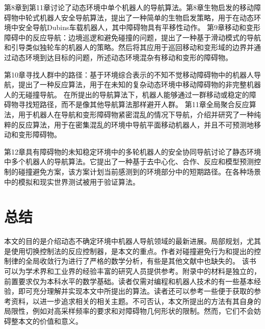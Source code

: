 第8章到第11章讨论了动态环境中单个机器人的导航算法。第8章生物启发的移动障碍物中轮式机器人安全导航算法，提出了一种简单的生物启发策略，用于在动态环境中安全导航Dubins车载机器人，其中障碍物具有平移性动作。
第9章移动和变形障碍中的反应导航：边境巡逻和避免碰撞的问题，提出了一种基于滑动模式的导航和引导类似独轮车的机器人的策略。然后将其应用于巡回移动和变形域的边界并通过动态环境到达目标的问题，所述动态环境混杂有移动和变形的障碍物。

第10章寻找人群中的路径：基于环境综合表示的不知不觉移动障碍物中的机器人导航，提出了一种反应算法，用于在未知的复杂动态环境中移动障碍物的非完整机器人的无碰撞导航。
在所提出的导航算法下，机器人能够通过一群移动或稳定的障碍物寻找短路径，而不是像其他导航算法那样避开人群。
第11章全局聚合反应算法，用于机器人在导航和变形障碍物紧密混乱的情况下导航，介绍并研究了一种纯粹的反应算法，用于在密集混乱的环境中导航平面移动机器人，并且不可预测地移动和变形障碍物。

第12章具有障碍物的未知稳定环境中的多轮机器人的安全协同导航讨论了静态环境中多个机器人的导航算法。它提出了一种基于去中心化、合作、反应和模型预测控制的碰撞避免方案，该方案计划当前感测到的环境部分中的短期路径。在各种场景中的模拟和现实世界测试被用于验证算法。

\section{总结}

本文的目的是介绍动态不确定环境中机器人导航领域的最新进展。局部规划，尤其是使用切换控制法的反应控制器，是本文的重点。作者对碰撞避免行为和提出的控制律的全局收敛行为进行了严格的数学分析，有些是其他文献中也缺失的。
该书可以为学术界和工业界的经验丰富的研究人员提供参考。附录中的材料是独立的，前置要求仅为本科水平的数学基础。读者仅需对编程和机器人技术的有一些基本经验，即可充分理解并实现本文中所提出的算法。读者还可以参考一些便于获取的参考资料，以进一步追求相关的相关主题。不可否认，本文所提出的方法有其自身的局限性，例如对高采样频率的要求和对障碍物几何形状的限制。然而，它们不会妨碍整本文的价值和意义。